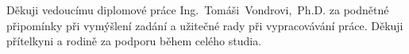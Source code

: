 Děkuji vedoucímu diplomové práce Ing.~Tomáši~Vondrovi,~Ph.D. za podnětné připomínky při vymýšlení zadání a užitečné rady při vypracovávání práce. Děkuji přítelkyni a rodině za podporu během celého studia.
